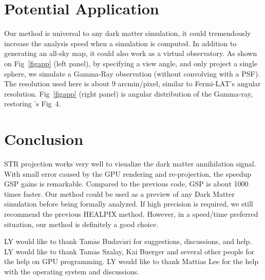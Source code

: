 \section{Potential Application}
Our method is universal to any dark matter simulation, it could tremendously increase the analysis speed when a simulation is computed. In addition to generating an all-sky map, it could also work as a virtual observatory. As shown on Fig~\ref{figapp} (left panel), by specifying a view angle, and only project a single sphere, we simulate a Gamma-Ray observation (without convolving with a PSF). The resolution used here is about $9$ arcmin/pixel, similar to Fermi-LAT's angular resolution. Fig~\ref{figapp} (right panel) is angular distribution of the Gamma-ray, restoring \citet{Kuhlen:2008kr}'s Fig~4. 

\section{Conclusion}
STR projection works very well to visualize the dark matter annihilation signal. With small error caused by the GPU rendering and re-projection, the speedup GSP gains is remarkable. Compared to the previous code, GSP is about 1000 times faster. Our method could be used as a preview of any Dark Matter simulation before being formally analyzed. If high precision is required, we still recommend the previous HEALPIX method. However, in a speed/time preferred situation, our method is definitely a good choice. 

\acknowledgements LY would like to thank Tam$\mathrm{\acute{a}}$s Budav$\mathrm{\acute{a}}$ri for suggestions, discussions, and help. LY would like to thank Tam$\mathrm{\acute{a}}$s Szalay, Kai Buerger and several other people for the help on GPU programming. LY would like to thank Mattias Lee for the help with the operating system and discussions. 



